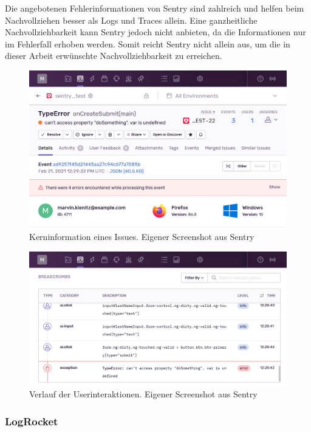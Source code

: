 Die angebotenen Fehlerinformationen von Sentry sind zahlreich und helfen beim Nachvollziehen besser als Logs und Traces allein. Eine ganzheitliche Nachvollziehbarkeit kann Sentry jedoch nicht anbieten, da die Informationen nur im Fehlerfall erhoben werden. Somit reicht Sentry nicht allein aus, um die in dieser Arbeit erwünschte Nachvollziehbarkeit zu erreichen.

\begin{figure}[H]
	\centering
	\includegraphics[width=1.00\linewidth]{img/03_methoden/sentry_issue-details.png}
	\caption{Kerninformation eines Issues. Eigener Screenshot aus Sentry}
	\label{fig:sentry_issue-details}
\end{figure}

\begin{figure}[H]
	\centering
	\includegraphics[width=1.00\linewidth]{img/03_methoden/sentry_issue-event-breadcrumbs.png}
	\caption{Verlauf der Userinteraktionen. Eigener Screenshot aus Sentry}
	\label{fig:sentry_issue-event-breadcrumbs}
\end{figure}

\subsubsection{LogRocket}
\label{subsec:logrocket}

